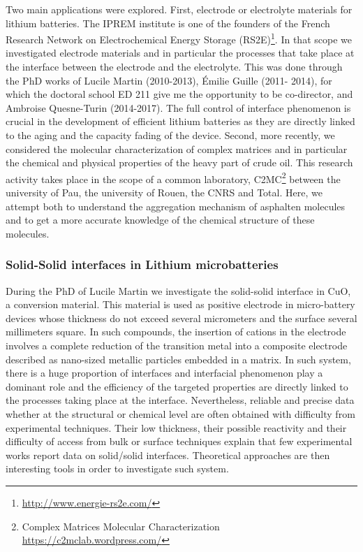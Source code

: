 \documentclass[11pt]{artuppax}
\newcounter{subsec}[section]
\begin{document}
Two main applications
were explored. First, electrode or electrolyte materials for lithium batteries. The IPREM
institute is one of the founders of the French Research Network on Electrochemical Energy
Storage (RS2E)\footnote{\url{http://www.energie-rs2e.com/}}. In that scope we investigated
electrode materials and in particular the processes that take place at the interface between
the electrode and the electrolyte. This was done through the PhD works of Lucile Martin
(2010-2013), Émilie Guille (2011- 2014), for which the doctoral school ED 211 give me
the opportunity to be co-director, and Ambroise Quesne-Turin (2014-2017). The full control
of interface phenomenon is crucial in the development of efficient lithium batteries as
they are directly linked to the aging and the capacity fading of the device. Second, more
recently, we considered the molecular characterization of complex matrices and in particular
the chemical and physical properties of the heavy part of crude oil. This research activity
takes place in the scope of a common laboratory, C2MC\footnote{Complex Matrices Molecular
Characterization \url{https://c2mclab.wordpress.com/}}
between the university of Pau, the university of Rouen, the CNRS and Total. Here, we attempt
both to understand the aggregation mechanism of asphalten molecules and to get a more
accurate knowledge of the chemical structure of these molecules.

\subsubsection{Solid-Solid interfaces in Lithium microbatteries}

During the PhD of Lucile Martin we investigate the solid-solid interface in CuO, a conversion
material. This material is used as positive electrode in micro-battery devices whose
thickness do not exceed several micrometers and the surface several millimeters square.
In such compounds, the insertion of  cations in the electrode involves a complete
reduction of the transition metal into a composite electrode described as nano-sized
metallic particles embedded in a  matrix.
In such system, there is a huge proportion of interfaces and interfacial phenomenon play
a dominant role and the efficiency of the targeted properties are directly linked to
the processes taking place at the interface. Nevertheless, reliable
and precise data whether at the structural or chemical level are often obtained with difficulty
from experimental techniques. Their low thickness, their possible reactivity and their difficulty
of access from bulk or surface techniques explain that few experimental works report data on
solid/solid interfaces. Theoretical approaches are then interesting tools in order to investigate
such system.
\end{document}
